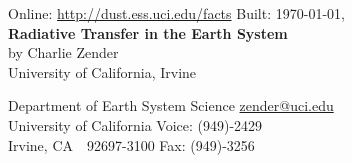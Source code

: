 \documentclass[12pt]{article}
\begin{document}


\begin{center}
Online: \url{http://dust.ess.uci.edu/facts} \hfill Built: \shortdate\today, \xxivtime\\
\bigskip
{\Large \textbf{Radiative Transfer in the Earth System}}\\
\bigskip
by Charlie Zender\\
University of California, Irvine\\
\end{center}
Department of Earth System Science \hfill \url{zender@uci.edu}\\
University of California \hfill Voice: (949)-2429\\
Irvine, CA~~92697-3100 \hfill Fax: (949)-3256
\end{document}
